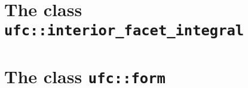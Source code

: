 
\section{The class \texttt{ufc::interior\_facet\_integral}}







\section{The class \texttt{ufc::form}}






